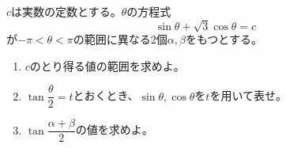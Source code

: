 \documentclass[8pt,dvipdfmx]{article}[b5paper]
\begin{document}
\begin{tcolorbox}[title=数学\textcircled{\scriptsize 3} 2-4 C]
$c$は実数の定数とする。$\theta$の方程式
\[
\sin\theta+\sqrt{3}\cos\theta=c
\]
が$-\pi<\theta<\pi$の範囲に異なる2個$\alpha,\beta$をもつとする。
\begin{enumerate}[(1)]
\item $c$のとり得る値の範囲を求めよ。
\item $\tan\dfrac{\theta}{2}=t$とおくとき、$\sin\theta,\cos\theta$を$t$を用いて表せ。
\item $\tan\dfrac{\alpha+\beta}{2}$の値を求めよ。
\end{enumerate}
\end{tcolorbox}




\end{document}
